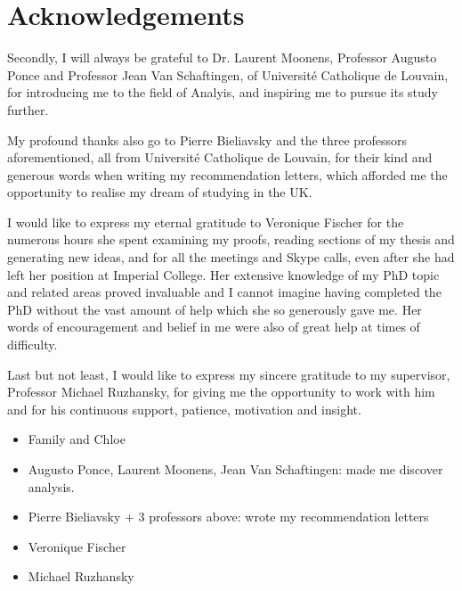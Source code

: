 \chapter*{Acknowledgements}

Secondly, I will always be grateful to Dr. Laurent Moonens, Professor Augusto Ponce and Professor Jean Van Schaftingen,
of Universit\'e Catholique de Louvain,
for introducing me to the field of Analyis,
and inspiring me to pursue its study further.

My profound thanks also go to Pierre Bieliavsky and the three professors aforementioned,
all from Universit\'e Catholique de Louvain,
for their kind and generous words when writing my recommendation letters,
which afforded me the opportunity to realise my dream of studying in the UK.

I would like to express my eternal gratitude to Veronique Fischer for the numerous hours she spent examining my proofs,
reading sections of my thesis and generating new ideas,
and for all the meetings and Skype calls,
even after she had left her position at Imperial College.
Her extensive knowledge of my PhD topic and related areas proved invaluable and I cannot imagine having completed the PhD without the vast amount of help which she so generously gave me.
Her words of encouragement and belief in me were also of great help at times of difficulty.

Last but not least,
I would like to express my sincere gratitude to my supervisor,
Professor Michael Ruzhansky,
for giving me the opportunity to work with him and for his continuous support, patience, motivation and insight.

\begin{itemize}
    \item Family and Chloe
    \item Augusto Ponce, Laurent Moonens, Jean Van Schaftingen: made me discover analysis.
    \item Pierre Bieliavsky + 3 professors above: wrote my recommendation letters
    \item Veronique Fischer
    \item Michael Ruzhansky
\end{itemize}
